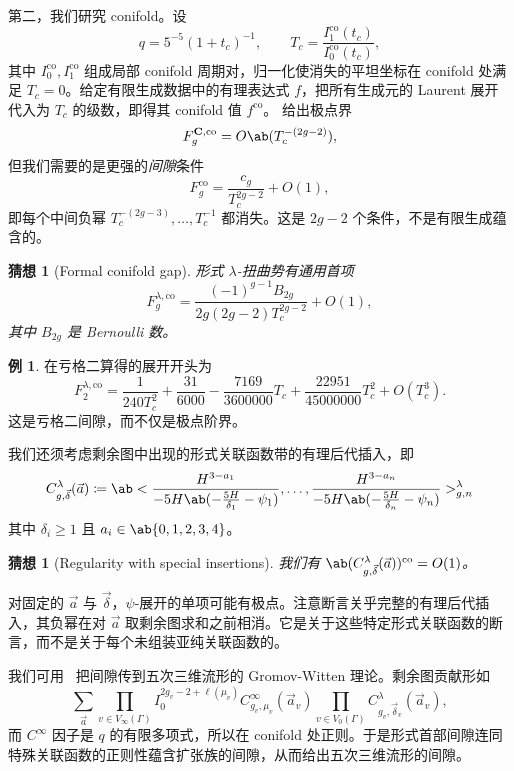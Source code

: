 \documentclass{amsart}
\newtheorem{conj}[thm]{猜想}
\theoremstyle{definition}
\newtheorem{exm}[thm]{例}
\theoremstyle{remark}
\theoremstyle{plain}
\theoremstyle{definition}
\theoremstyle{remark}
\newcommand{\mbf}[1]{\mathbf{#1}}
\newcommand{\mr}[1]{\mathrm{#1}}
\newcommand{\1}{\mathbf{1}}
\newcommand{\2}{\mathbf{2}}
\newcommand{\3}{\mathbf{3}}
\begin{document}
第二，我们研究 conifold。设
\[ q = 5^{-5}(1+t_c)^{-1}, \qquad T_c = \frac{I_1^{\mr{co}}(t_c)}{I_0^{\mr{co}}(t_c)}, \]
其中 \(I_0^{\mr{co}}, I_1^{\mr{co}}\) 组成局部 conifold 周期对，归一化使消失的平坦坐标在 conifold 处满足 \(T_c = 0\)。给定有限生成数据中的有理表达式 \(f\)，把所有生成元的 Laurent 展开代入为 \(T_c\) 的级数，即得其 conifold 值 \(f^{\mr{co}}\)。 给出极点界
\[ F_g^{\mbf{C},\mr{co}} = O\ab(T_c^{-(2g-2)}), \]
但我们需要的是更强的\textit{间隙}条件
\[ F_g^{\mr{co}} = \frac{c_g}{T_c^{2g-2}} + O(1), \]
即每个中间负幂 \(T_c^{-(2g-3)}, \ldots, T_c^{-1}\) 都消失。这是 \(2g-2\) 个条件，不是有限生成蕴含的。

\begin{conj}[Formal conifold gap]%
\label{conj:formal conifold gap}
    形式 \(\lambda\)-扭曲势有通用首项
    \[ F_g^{\lambda,\mr{co}} = \frac{(-1)^{g-1}B_{2g}}{2g(2g-2)T_c^{2g-2}} + O(1), \]
    其中 \(B_{2g}\) 是 Bernoulli 数。
\end{conj}

\begin{exm}
    在亏格二算得的展开开头为
    \[ F_2^{\lambda,\mr{co}} = \frac{1}{240T_c^2} + \frac{31}{6000} - \frac{7169}{3600000}T_c + \frac{22951}{45000000}T_c^2 + O(T_c^3). \]
    这是亏格二间隙，而不仅是极点阶界。
\end{exm}

我们还须考虑剩余图中出现的形式关联函数带的有理后代插入，即
\[ C^{\lambda}_{g,\vec{\delta}}(\vec{a}) \coloneqq \ab< \frac{H^{3-a_1}}{-5H\ab(-\frac{5H}{\delta_1}-\psi_1)}, \ldots, \frac{H^{3-a_n}}{-5H\ab(-\frac{5H}{\delta_n}-\psi_n)}>^{\lambda}_{g,n} \]
其中 \(\delta_i \geq 1\) 且 \(a_i \in \ab\{0,1,2,3,4\}\)。

\begin{conj}[Regularity with special insertions]%
\label{conj:special correlator regularity}
    我们有 \(\ab(C^{\lambda}_{g,\vec{\delta}}(\vec{a}))^{\mr{co}} = O(1)\)。
\end{conj}

对固定的 \(\vec{a}\) 与 \(\vec{\delta}\)，\(\psi\)-展开的单项可能有极点。注意断言关乎完整的有理后代插入，其负幂在对 \(\vec{a}\) 取剩余图求和之前相消。它是关于这些特定形式关联函数的断言，而不是关于每个未组装亚纯关联函数的。

我们可用~ 把间隙传到五次三维流形的 Gromov-Witten 理论。剩余图贡献形如
\[ \sum_{\vec{a}} \prod_{v \in V_{\infty}(\Gamma)}I_0^{2g_v-2+\ell(\mu_v)}C^{\infty}_{g_v,\mu_v}(\vec{a}_v)\prod_{v\in V_0(\Gamma)}C^{\lambda}_{g_v,\vec{\delta}_v}(\vec{a}_v), \]
而 \(C^{\infty}\) 因子是 \(q\) 的有限多项式，所以在 conifold 处正则。于是形式首部间隙连同特殊关联函数的正则性蕴含扩张族的间隙，从而给出五次三维流形的间隙。
\end{document}
